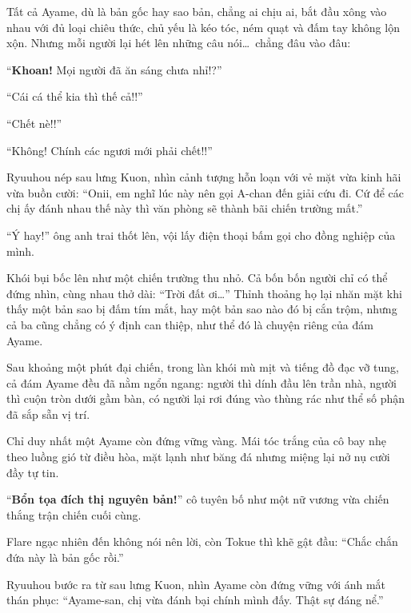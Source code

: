 \documentclass[../main.tex]{subfiles}
\begin{document}
Tất cả Ayame, dù là bản gốc hay sao bản, chẳng ai chịu ai, bắt đầu xông vào nhau với đủ loại chiêu thức, chủ yếu là kéo tóc, ném quạt và đấm tay không lộn xộn. Nhưng mỗi người lại hét lên những câu nói\dots\ chẳng đâu vào đâu:

``\textbf{Khoan!} Mọi người đã ăn sáng chưa nhỉ!?''

``Cái cá thể kia thì thế cả!!''

``Chết nè!!''

``Không! Chính các ngươi mới phải chết!!''

\begin{figure}[H]
  \centering
\end{figure}

Ryuuhou nép sau lưng Kuon, nhìn cảnh tượng hỗn loạn với vẻ mặt vừa kinh hãi vừa buồn cười: ``Onii, em nghĩ lúc này nên gọi A-chan đến giải cứu đi. Cứ để các chị ấy đánh nhau thế này thì văn phòng sẽ thành bãi chiến trường mất.''

``Ý hay!'' ông anh trai thốt lên, vội lấy điện thoại bấm gọi cho đồng nghiệp của mình.

Khói bụi bốc lên như một chiến trường thu nhỏ. Cả bốn bốn người chỉ có thể đứng nhìn, cùng nhau thở dài: ``Trời đất ơi\dots'' Thỉnh thoảng họ lại nhăn mặt khi thấy một bản sao bị đấm tím mắt, hay một bản sao nào đó bị cắn trộm, nhưng cả ba cũng chẳng có ý định can thiệp, như thể đó là chuyện riêng của đám Ayame.

Sau khoảng một phút đại chiến, trong làn khói mù mịt và tiếng đồ đạc vỡ tung, cả đám Ayame đều đã nằm ngổn ngang: người thì dính đầu lên trần nhà, người thì cuộn tròn dưới gầm bàn, có người lại rơi đúng vào thùng rác như thể số phận đã sắp sẵn vị trí.


Chỉ duy nhất một Ayame còn đứng vững vàng. Mái tóc trắng của cô bay nhẹ theo luồng gió từ điều hòa, mặt lạnh như băng đá nhưng miệng lại nở nụ cười đầy tự tin.

``\textbf{Bổn tọa đích thị nguyên bản!}'' cô tuyên bố như một nữ vương vừa chiến thắng trận chiến cuối cùng.

Flare ngạc nhiên đến không nói nên lời, còn Tokue thì khẽ gật đầu: ``Chắc chắn đứa này là bản gốc rồi.''

Ryuuhou bước ra từ sau lưng Kuon, nhìn Ayame còn đứng vững với ánh mắt thán phục: ``Ayame-san, chị vừa đánh bại chính mình đấy. Thật sự đáng nể.''
\end{document}
